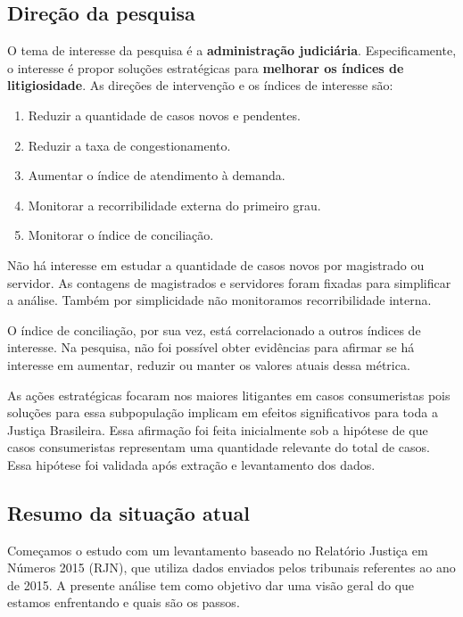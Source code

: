 \documentclass[]{report}
\providecommand{\tightlist}{%
  \setlength{\itemsep}{0pt}\setlength{\parskip}{0pt}}
\begin{document}
\subsection{Direção da pesquisa}\label{direcao-da-pesquisa}

O tema de interesse da pesquisa é a \textbf{administração judiciária}.
Especificamente, o interesse é propor soluções estratégicas para
\textbf{melhorar os índices de litigiosidade}. As direções de
intervenção e os índices de interesse são:

\begin{enumerate}
\def\labelenumi{\arabic{enumi}.}
\tightlist
\item
  Reduzir a quantidade de casos novos e pendentes.
\item
  Reduzir a taxa de congestionamento.
\item
  Aumentar o índice de atendimento à demanda.
\item
  Monitorar a recorribilidade externa do primeiro grau.
\item
  Monitorar o índice de conciliação.
\end{enumerate}

Não há interesse em estudar a quantidade de casos novos por magistrado
ou servidor. As contagens de magistrados e servidores foram fixadas para
simplificar a análise. Também por simplicidade não monitoramos
recorribilidade interna.

O índice de conciliação, por sua vez, está correlacionado a outros
índices de interesse. Na pesquisa, não foi possível obter evidências
para afirmar se há interesse em aumentar, reduzir ou manter os valores
atuais dessa métrica.

As ações estratégicas focaram nos maiores litigantes em casos
consumeristas pois soluções para essa subpopulação implicam em efeitos
significativos para toda a Justiça Brasileira. Essa afirmação foi feita
inicialmente sob a hipótese de que casos consumeristas representam uma
quantidade relevante do total de casos. Essa hipótese foi validada após
extração e levantamento dos dados.

\subsection{Resumo da situação atual}\label{resumo-da-situacao-atual}

Começamos o estudo com um levantamento baseado no Relatório Justiça em
Números 2015 (RJN), que utiliza dados enviados pelos tribunais
referentes ao ano de 2015. A presente análise tem como objetivo dar uma
visão geral do que estamos enfrentando e quais são os passos.
\end{document}
